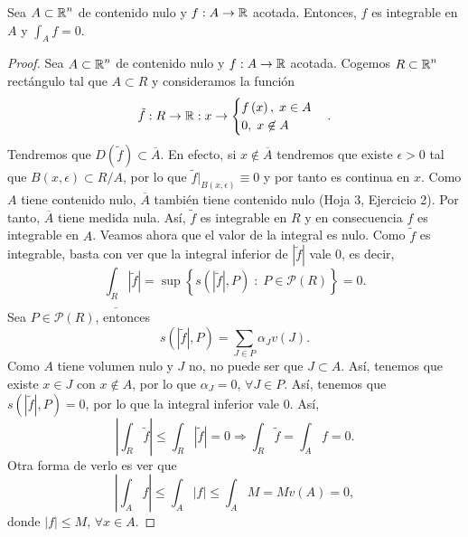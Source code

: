 \begin{prop}
Sea $\displaystyle A \subset \mathbb{R}^{n}$ de contenido nulo y $\displaystyle f : A \to \mathbb{R} $ acotada. Entonces, $\displaystyle f $ es integrable en $\displaystyle A $ y $\displaystyle \int _{A}f = 0 $. 
\end{prop}
\begin{proof}
	Sea $\displaystyle A \subset \mathbb{R}^{n} $ de contenido nulo y $\displaystyle f : A \to \mathbb{R} $ acotada. Cogemos $\displaystyle R \subset \mathbb{R}^{n} $ rectángulo tal que $\displaystyle A \subset R $ y consideramos la función
	\[\tilde{f} : R \to \mathbb{R} : x \to 
	\begin{cases}
	f\left(x\right) , \; x \in A \\
	0, \; x \not\in A
	\end{cases}
	.\]
	Tendremos que $\displaystyle D\left(\tilde{f}\right) \subset \overline{A} $. En efecto, si $\displaystyle x \not\in \overline{A} $ tendremos que existe $\displaystyle \epsilon > 0 $ tal que $\displaystyle B\left(x,\epsilon \right)\subset R/A $, por lo que $\displaystyle \tilde{f}|_{B\left(x,\epsilon \right)} \equiv 0 $ y por tanto es continua en $\displaystyle x $. Como $\displaystyle A $ tiene contenido nulo, $\displaystyle \overline{A} $ también tiene contenido nulo (Hoja 3, Ejercicio 2). Por tanto, $\displaystyle \overline{A} $ tiene medida nula. Así, $\displaystyle \tilde{f} $ es integrable en $\displaystyle R $ y en consecuencia $\displaystyle f $ es integrable en $\displaystyle A $. 
	Veamos ahora que el valor de la integral es nulo. Como $\displaystyle \tilde{f} $ es integrable, basta con ver que la integral inferior de $\displaystyle \left|\tilde{f}\right| $ vale 0, es decir,
	\[\underline{\int _{R}} \left|\tilde{f}\right| = \sup \left\{ s\left( \left|\tilde{f}\right|, P\right) \; : \; P \in \mathcal{P}\left(R\right)\right\}  = 0.\]
Sea $\displaystyle P \in \mathcal{P}\left(R\right) $, entonces
\[s\left( \left|\tilde{f}\right|, P\right) = \sum_{J \in P} \alpha_{J}v\left(J\right) .\]
Como $\displaystyle A $ tiene volumen nulo y $\displaystyle J $ no, no puede ser que $\displaystyle J \subset A $. Así, tenemos que existe $\displaystyle x \in J $ con $\displaystyle x \not\in A $, por lo que $\displaystyle \alpha_{J} = 0 $, $\displaystyle \forall J \in P $. Así, tenemos que $\displaystyle s\left( \left|\tilde{f}\right|, P\right) = 0 $, por lo que la integral inferior vale 0. Así, 
\[ \left|\int _{R} \tilde{f} \right| \leq \int _{R} \left|\tilde{f}\right| = 0 \Rightarrow \int _{R}\tilde{f} = \int _{A}f = 0.\]
Otra forma de verlo es ver que 
\[ \left|\int _{A}f \right|\leq \int _{A} \left|f\right| \leq \int _{A} M  = Mv\left(A\right)= 0 ,\]
donde $\displaystyle \left|f\right| \leq M $, $\displaystyle \forall x \in A $. 
\end{proof}

